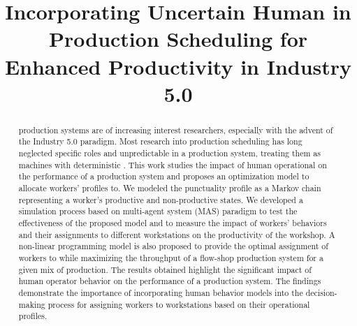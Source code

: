 \documentclass[review,12pt, 3p, times]{elsarticle}
\begin{document}
\begin{frontmatter}
\title{Incorporating Uncertain Human in Production Scheduling for Enhanced Productivity in Industry 5.0 }










\begin{abstract}
 
production systems are of increasing interest  researchers, especially with the advent of the Industry 5.0 paradigm. Most research into production scheduling has long neglected  specific roles and unpredictable  in a production system, treating them as machines with deterministic . This work studies the impact of human operational on the performance of a production system and proposes an optimization model to allocate workers' profiles to. We modeled the punctuality profile as a Markov chain representing a worker's productive and non-productive states. We developed a simulation process based on  multi-agent system (MAS) paradigm to test the effectiveness of the proposed model and to measure the impact of workers' behaviors and their assignments to different workstations on the productivity of the workshop. A non-linear programming model is also proposed to provide the optimal assignment of workers to  while maximizing the throughput of a  flow-shop production system for a given mix of production. The results obtained highlight the significant impact of human operator behavior on the performance of a production system. The findings demonstrate the importance of incorporating human behavior models into the decision-making process for assigning workers to workstations based on their operational profiles.
\end{abstract}



\end{frontmatter}
\end{document}
